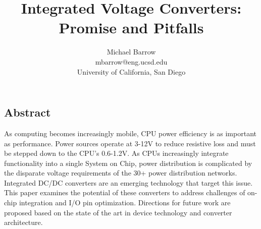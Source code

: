 \documentclass[letterpaper,twocolumn,10pt]{article}
\begin{document}
\date{}

\title{\Large \bf Integrated Voltage Converters: Promise and Pitfalls}

\author{
{\rm Michael Barrow}\\
mbarrow@eng.ucsd.edu\\
University of California, San Diego
}

\maketitle

\thispagestyle{empty}


\subsection*{Abstract}

As computing becomes increasingly mobile, CPU power efficiency is as important as performance.
Power sources operate at 3-12V to reduce resistive loss and must be stepped down to the CPU's 0.6-1.2V. As CPUs increasingly integrate functionality into a single System on Chip, power distribution is complicated by the disparate voltage requirements of the 30+ power distribution networks.\\ 
Integrated DC/DC converters are an emerging technology that target this issue. This paper examines the potential of these converters to address challenges of on-chip integration and I/O pin optimization. Directions for future work are proposed based on the state of the art in device technology and converter architecture.  
\end{document}
